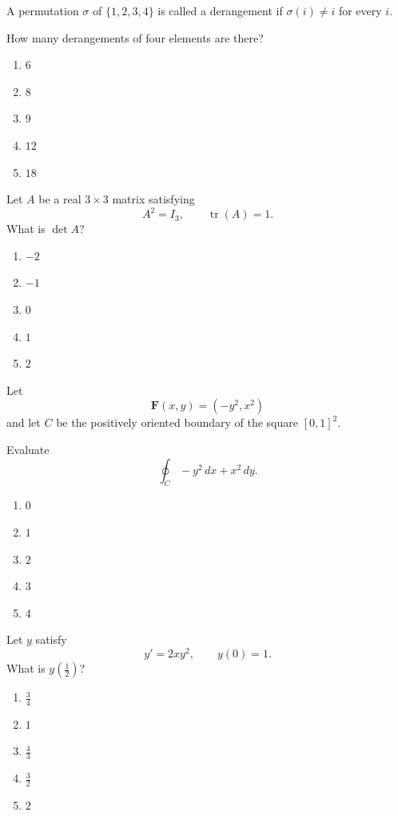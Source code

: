 \begin{exercise}
A permutation $\sigma$ of
$\{1,2,3,4\}$ is called a derangement
if $\sigma(i)\neq i$ for every $i$.

How many derangements of four elements
are there?
\begin{enumerate}[label=(\Alph*)]
\item $6$
\item $8$
\item $9$
\item $12$
\item $18$
\end{enumerate}
\end{exercise}

\begin{exercise}
Let $A$ be a real $3\times3$ matrix
satisfying
\[
A^2=I_3,
\qquad \operatorname{tr}(A)=1.
\]
What is $\det A$?
\begin{enumerate}[label=(\Alph*)]
\item $-2$
\item $-1$
\item $0$
\item $1$
\item $2$
\end{enumerate}
\end{exercise}

\begin{exercise}
Let
\[
\mathbf F(x,y)=(-y^2,x^2)
\]
and let $C$ be the positively oriented
boundary of the square $[0,1]^2$.

Evaluate
\[
\oint_C -y^2\,dx+x^2\,dy.
\]
\begin{enumerate}[label=(\Alph*)]
\item $0$
\item $1$
\item $2$
\item $3$
\item $4$
\end{enumerate}
\end{exercise}

\begin{exercise}
Let $y$ satisfy
\[
y'=2xy^2,
\qquad y(0)=1.
\]
What is $y(\frac12)$?
\begin{enumerate}[label=(\Alph*)]
\item $\frac34$
\item $1$
\item $\frac43$
\item $\frac32$
\item $2$
\end{enumerate}
\end{exercise}

